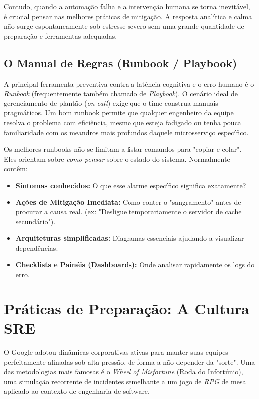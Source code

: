 \documentclass[12pt,a4paper,twoside]{report}
\begin{document}
Contudo, quando a automação falha e a intervenção humana se torna inevitável, é crucial pensar nas melhores práticas de mitigação. A resposta analítica e calma não surge espontaneamente sob estresse severo sem uma grande quantidade de preparação e ferramentas adequadas.

\subsection{O Manual de Regras (Runbook / Playbook)}

A principal ferramenta preventiva contra a latência cognitiva e o erro humano é o \textit{Runbook} (frequentemente também chamado de \textit{Playbook}). O cenário ideal de gerenciamento de plantão (\textit{on-call}) exige que o time construa manuais pragmáticos. Um bom runbook permite que qualquer engenheiro da equipe resolva o problema com eficiência, mesmo que esteja fadigado ou tenha pouca familiaridade com os meandros mais profundos daquele microsserviço específico.

Os melhores runbooks não se limitam a listar comandos para "copiar e colar". Eles orientam sobre \textit{como pensar} sobre o estado do sistema. Normalmente contêm:
\begin{itemize}
    \item \textbf{Sintomas conhecidos:} O que esse alarme específico significa exatamente?
    \item \textbf{Ações de Mitigação Imediata:} Como conter o "sangramento" antes de procurar a causa real. (ex: "Desligue temporariamente o servidor de cache secundário").
    \item \textbf{Arquiteturas simplificadas:} Diagramas essenciais ajudando a visualizar dependências.
    \item \textbf{Checklists e Painéis (Dashboards):} Onde analisar rapidamente os logs do erro.
\end{itemize}

\section{Práticas de Preparação: A Cultura SRE}

O Google adotou dinâmicas corporativas ativas para manter suas equipes perfeitamente afinadas sob alta pressão, de forma a não depender da "sorte". Uma das metodologias mais famosas é o \textit{Wheel of Misfortune} (Roda do Infortúnio), uma simulação recorrente de incidentes semelhante a um jogo de \textit{RPG} de mesa aplicado ao contexto de engenharia de software.
\end{document}
